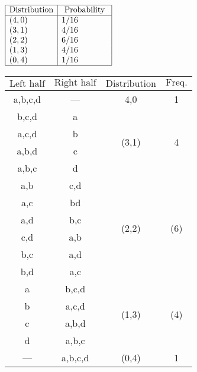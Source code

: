 \begin{answer}$\left. \right. $\\
	\begin{minipage}{0.35\textwidth}
		$\begin{array}{|l|l|}\hline\text{Distribution}&\text{ Probability }\\ \hline(4,0) & 1 / 16 \\ (3,1) & 4 / 16 \\ (2,2) & 6 / 16 \\ (1,3) & 4 / 16 \\ (0,4) & 1 / 16\\ \hline \end{array}$
	\end{minipage}\hfil
	\begin{minipage}{0.35\textwidth}
		\begin{table}[H]
			\begin{tabular}{|c|c|c|c|}
				\hline
				$\text{Left half}$&$\text{Right half}$&$\text{Distribution}$&$\text{Freq.}$\\\hline
				a,b,c,d&---&4,0&1\\\hline
				b,c,d&a&\multirow{4}{*}{(3,1)}&\multirow{4}{*}{4}\\\cline{1-2}
				a,c,d&b & &\\\cline{1-2}
				a,b,d&c& &\\\cline{1-2}
				a,b,c&d& &\\\cline{1-2}\hline
				a,b&c,d&\multirow{6}{*}{(2,2)}&\multirow{6}{*}{(6)}\\\cline{1-2}
				a,c&bd& & \\\cline{1-2}
				a,d& b,c& & \\\cline{1-2}
				c,d&a,b& & \\\cline{1-2}
				b,c& a,d& & \\\cline{1-2}
				b,d&a,c& & \\\cline{1-2}\hline
				a&b,c,d&\multirow{4}{*}{(1,3)}&\multirow{4}{*}{(4)}\\\cline{1-2} 
				b&a,c,d& & \\\cline{1-2}
				c&a,b,d & &\\\cline{1-2}
				d&a,b,c & &\\\hline
				---&a,b,c,d &(0,4) &1 \\\hline
			\end{tabular}
		\end{table}
	\end{minipage}
\end{answer}
